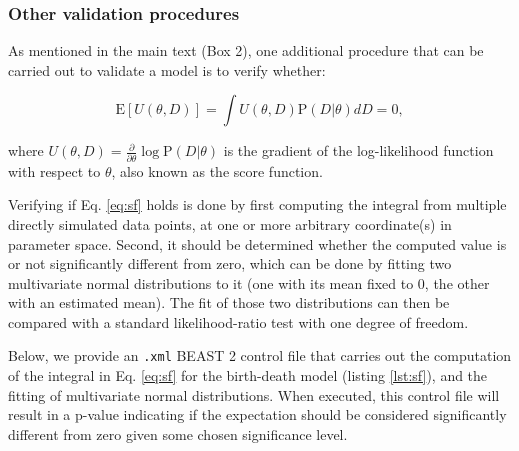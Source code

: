 \documentclass[oneside]{article}
\begin{document}
\subsubsection*{Other validation procedures}

As mentioned in the main text (Box 2), one additional procedure
that can be carried out to validate a model is to verify whether:

\begin{equation}\label{eq:sf}
  \text{E}[U(\theta,D)] = \int U(\theta,D)\text{P}(D|\theta)dD = 0,
\end{equation}

\noindent where $U(\theta,D)=\frac{\partial}{\partial\theta}\log
\text{P}(D|\theta)$ is the gradient of the log-likelihood function with
respect to $\theta$, also known as the score function.

Verifying if Eq. \ref{eq:sf} holds is done by first computing the
integral from multiple directly simulated data points, at one or
more arbitrary coordinate(s) in parameter space.
Second, it should be determined whether the computed value is or not
significantly different from zero, which can be done by fitting two
multivariate normal distributions to it (one with its mean fixed
to 0, the other with an estimated mean).
The fit of those two distributions can then be compared with a
standard likelihood-ratio test with one degree of freedom.

Below, we provide an \texttt{.xml} BEAST 2 control file that carries out the
computation of the integral in Eq. \ref{eq:sf} for the birth-death
model (listing \ref{lst:sf}), and the fitting of multivariate normal distributions.
When executed, this control file will result in a p-value indicating if
the expectation should be considered significantly different from zero
given some chosen significance level.
\end{document}
